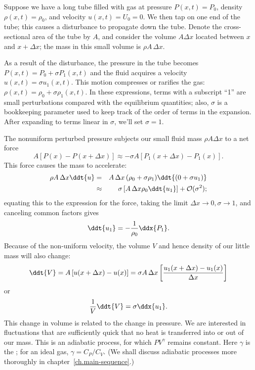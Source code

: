 \begin{sidebar}
\label{b.sound-speed}
Suppose we have a long tube filled with gas at pressure $P(x,t) = P_{0}$, density $\rho(x,t) = \rho_{0}$, and velocity $u(x,t) = U_{0} = 0$. We then tap on one end of the tube; this causes a disturbance to propagate down the tube. Denote the cross-sectional area of the tube by $A$, and consider the volume $A\Delta x$ located between $x$ and $x+\Delta x$; the mass in this small volume is $\rho A\,\Delta x$.

As a result of the disturbance, the pressure in the tube becomes $P(x,t) = P_{0}+\sigma P_{1}(x,t)$ and the fluid acquires a velocity $u(x,t) = \sigma u_{1}(x,t)$. This motion compresses or rarifies the gas: $\rho(x,t) = \rho_{0} + \sigma\rho_{1}(x,t)$. In these expressions, terms with a subscript ``1'' are small perturbations compared with the equilibrium quantities; also, $\sigma$ is a bookkeeping parameter used to keep track of the order of terms in the expansion. After expanding to terms linear in $\sigma$, we'll set $\sigma=1$. 

The nonuniform perturbed pressure subjects our small fluid mass $\rho A\Delta x$ to a net force
\[
	A \left[ P(x) - P(x+\Delta x) \right] \approx -\sigma A \left[P_{1}(x+\Delta x)-P_{1}(x)\right].
\]
This force causes the mass to accelerate:
\begin{eqnarray*}
	\rho A\,\Delta x \ddt{u} &=& A\,\Delta x\,(\rho_{0} + \sigma\rho_{1})\ddt{(0 + \sigma u_{1})}\\
	&\approx& \sigma\left[A\,\Delta x \rho_{0}\ddt{u_{1}}\right] + \mathcal{O}(\sigma^{2});
\end{eqnarray*}
equating this to the expression for the force, taking the limit $\Delta x\to 0,\sigma\to 1$, and canceling common factors gives
\begin{equation}\label{e.sound-speed-ut}
	\ddt{u_{1}} = -\frac{1}{\rho_{0}}\ddx{P_{1}}.
\end{equation}
Because of the non-uniform velocity, the volume $V$ and hence density of our little mass will also change:
\[
	\ddt{V} = A\left[u(x+\Delta x)-u(x)\right] 
		= \sigma A\,\Delta x\left[\frac{u_{1}(x+\Delta x)-u_{1}(x)}{\Delta x}\right]
\]
or
\begin{equation}\label{e.sound-speed-lnVt}
	\frac{1}{V}\ddt{V} = \sigma \ddx{u_{1}}.
\end{equation}
This change in volume is related to the change in pressure. We are interested in fluctuations that are sufficiently quick that no heat is transferred into or out of our mass. This is an adiabatic process, for which $PV^{\gamma}$ remains constant. Here $\gamma$ is the ; for an ideal gas, $\gamma = C_{P}/C_{V}$. (We shall discuss adiabatic processes more thoroughly in chapter~\ref{ch.main-sequence}.)


\end{sidebar}
